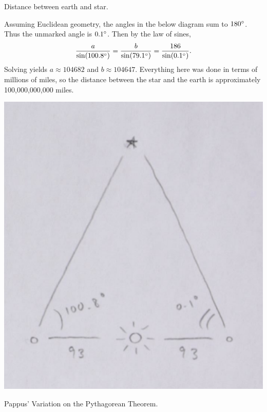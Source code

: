 \documentclass[twoside,10pt]{article}
\begin{document}

\begin{exer}[1.1]
Distance between earth and star.
\end{exer}

Assuming Euclidean geometry, the angles in the below diagram sum to $180^\circ$. Thus the unmarked angle is $0.1^\circ$. Then by the law of sines,
\[
	\frac{a}{\sin(100.8^\circ)} = \frac{b}{\sin(79.1^\circ)} = \frac{186}{\sin(0.1^\circ)} .
\] Solving yields $a \approx 104682$ and $b \approx 104647$. Everything here was done in terms of millions of miles, so the distance between the star and the earth is approximately 100,000,000,000 miles.

\begin{center}
	\includegraphics[scale=0.7]{fig/1}
\end{center}

\newpage

\begin{exer}[1.7]
	Pappus' Variation on the Pythagorean Theorem.
\end{exer}
\end{document}
